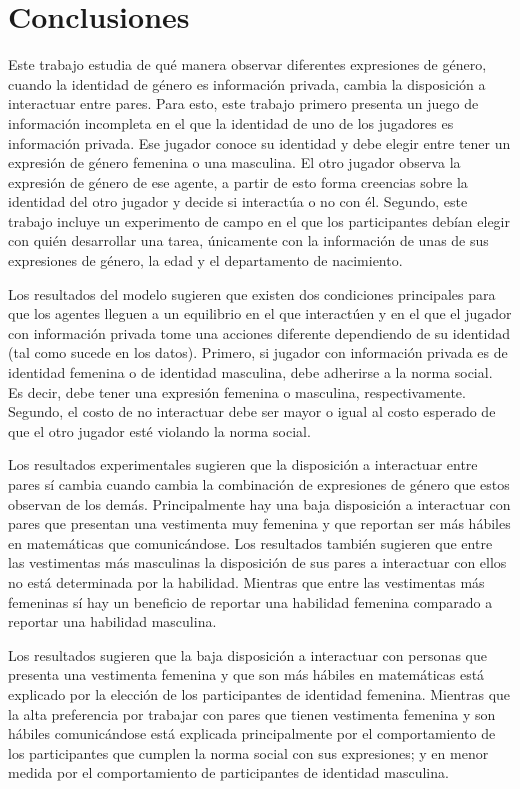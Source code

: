 \section{Conclusiones}
Este trabajo estudia de qué manera observar diferentes expresiones de género, cuando la identidad de género es información privada, cambia la disposición a interactuar entre pares. Para esto, este trabajo primero presenta un juego de información incompleta en el que la identidad de uno de los jugadores es información privada. Ese jugador conoce su identidad y debe elegir entre tener un expresión de género femenina o una masculina. El otro jugador observa la expresión de género de ese agente, a partir de esto forma creencias sobre la identidad del otro jugador y decide si interactúa o no con él. Segundo, este trabajo incluye un experimento de campo en el que los participantes debían elegir con quién desarrollar una tarea, únicamente con la información de unas de sus expresiones de género, la edad y el departamento de nacimiento. 

Los resultados del modelo sugieren que existen dos condiciones principales para que los agentes lleguen a un equilibrio en el que interactúen y en el que el jugador con información privada tome una acciones diferente dependiendo de su identidad (tal como sucede en los datos). Primero, si jugador con información privada es de identidad femenina o de identidad masculina, debe adherirse a la norma social. Es decir, debe tener una expresión femenina o masculina, respectivamente. Segundo, el costo de no interactuar debe ser mayor o igual al costo esperado de que el otro jugador esté violando la norma social. 

Los resultados experimentales sugieren que la disposición a interactuar entre pares sí cambia cuando cambia la combinación de expresiones de género que estos observan de los demás. Principalmente hay una baja disposición a interactuar con pares que presentan una vestimenta muy femenina y que reportan ser más hábiles en matemáticas que comunicándose. Los resultados también sugieren que entre las vestimentas más masculinas la disposición de sus pares a interactuar con ellos no está determinada por la habilidad. Mientras que entre las vestimentas más femeninas sí hay un beneficio de reportar una habilidad femenina comparado a reportar una habilidad masculina. 

Los resultados sugieren que la baja disposición a interactuar con personas que presenta una vestimenta femenina y que son más hábiles en matemáticas está explicado por la elección de los participantes de identidad femenina. Mientras que la alta preferencia por trabajar con pares que tienen vestimenta femenina y son hábiles comunicándose está explicada principalmente por el comportamiento de los participantes que cumplen la norma social con sus expresiones; y en menor medida por el comportamiento de participantes de identidad masculina. 


